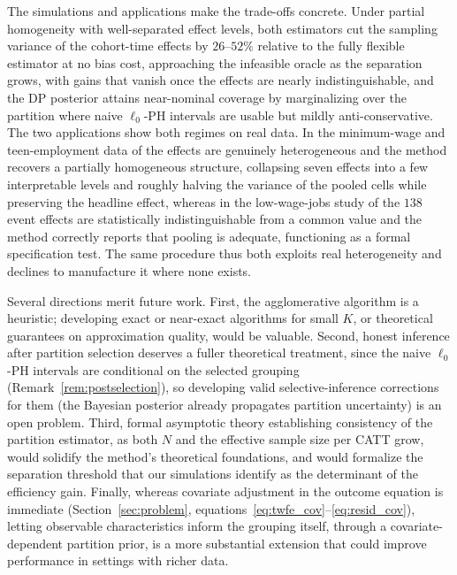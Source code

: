 \documentclass[margin=5in, 12pt]{article}
\newcommand{\1}{\mathbbm{1}}
\begin{document}
The simulations and applications make the trade-offs concrete. Under partial
homogeneity with well-separated effect levels, both estimators cut the sampling
variance of the cohort-time effects by $26$--$52\%$ relative to the fully
flexible estimator at no bias cost, approaching the infeasible oracle as the
separation grows, with gains that vanish once the effects are nearly
indistinguishable, and the DP posterior
attains near-nominal coverage by marginalizing over the partition where naive
$\ell_0$-PH intervals are usable but mildly anti-conservative. The two
applications show both regimes on real data. In the minimum-wage and
teen-employment data of \citet{callaway2021} the effects are genuinely
heterogeneous and the method recovers a partially homogeneous structure,
collapsing seven effects into a few interpretable levels and roughly halving the
variance of the pooled cells while preserving the headline effect, whereas in the
low-wage-jobs study of \citet{cengiz2019} the $138$ event effects are
statistically indistinguishable from a common value and the method correctly
reports that pooling is adequate, functioning as a formal specification test. The
same procedure thus both exploits real heterogeneity and declines to manufacture
it where none exists.

Several directions merit future work. First, the agglomerative algorithm is a heuristic; developing exact or near-exact algorithms for small $K$, or theoretical guarantees on approximation quality, would be valuable. Second, honest inference after partition selection deserves a fuller theoretical treatment, since the naive $\ell_0$-PH intervals are conditional on the selected grouping (Remark~\ref{rem:postselection}), so developing valid selective-inference corrections for them (the Bayesian posterior already propagates partition uncertainty) is an open problem. Third, formal asymptotic theory establishing consistency of the partition estimator, as both $N$ and the effective sample size per CATT grow, would solidify the method's theoretical foundations, and would formalize the separation threshold that our simulations identify as the determinant of the efficiency gain. Finally, whereas covariate adjustment in the outcome equation is immediate (Section~\ref{sec:problem}, equations~\eqref{eq:twfe_cov}--\eqref{eq:resid_cov}), letting observable characteristics inform the grouping itself, through a covariate-dependent partition prior, is a more substantial extension that could improve performance in settings with richer data.

\newpage


\end{document}
